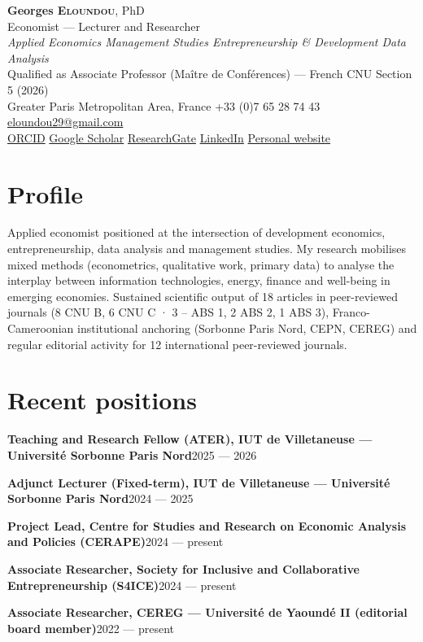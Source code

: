 \documentclass[
  french,
  10pt,
  letterpaper,
  DIV=11,
  numbers=noendperiod]{scrartcl}
\author{}
\date{}
\newcommand{\posteitem}[2]{\noindent\textbf{#1}\hfill{\color{softgray}\small #2}\par}
\begin{document}
\begin{center}
{\sffamily\fontsize{24pt}{28pt}\selectfont\textbf{\color{accent}Georges E\textsc{loundou}}, PhD}\\[4pt]
{\sffamily\large Economist — Lecturer and Researcher}\\[2pt]
{\itshape Applied Economics \;\textbar\; Management Studies \;\textbar\; Entrepreneurship \& Development \;\textbar\; Data Analysis}\\[6pt]
{\small\color{softgray} Qualified as Associate Professor (Maître de Conférences) — French CNU Section 5 (2026)}\\[8pt]
{\small Greater Paris Metropolitan Area, France \;\textbar\; +33 (0)7 65 28 74 43 \;\textbar\; \href{mailto:eloundou29@gmail.com}{eloundou29@gmail.com}}\\[3pt]
{\small \href{https://orcid.org/0000-0001-8187-5615}{ORCID} \;\textbar\; \href{https://scholar.google.com/citations?user=i_2zSosAAAAJ}{Google Scholar} \;\textbar\; \href{https://www.researchgate.net/profile/Georges-Ngnouwal-Eloundou}{ResearchGate} \;\textbar\; \href{https://www.linkedin.com/in/georges-eloundou}{LinkedIn} \;\textbar\; \href{https://georgeseloundou.github.io}{Personal website}}
\end{center}

\vspace{4pt}

\section{Profile}\label{profile}

Applied economist positioned at the intersection of development
economics, entrepreneurship, data analysis and management studies. My
research mobilises mixed methods (econometrics, qualitative work,
primary data) to analyse the interplay between information technologies,
energy, finance and well-being in emerging economies. Sustained
scientific output of 18 articles in peer-reviewed journals (8 CNU B, 6
CNU C · 3 -- ABS 1, 2 ABS 2, 1 ABS 3), Franco-Cameroonian institutional
anchoring (Sorbonne Paris Nord, CEPN, CEREG) and regular editorial
activity for 12 international peer-reviewed journals.

\section{Recent positions}\label{recent-positions}

\posteitem{Teaching and Research Fellow (ATER), IUT de Villetaneuse — Université Sorbonne Paris Nord}{2025 — 2026}
\posteitem{Adjunct Lecturer (Fixed-term), IUT de Villetaneuse — Université Sorbonne Paris Nord}{2024 — 2025}
\posteitem{Project Lead, Centre for Studies and Research on Economic Analysis and Policies (CERAPE)}{2024 — present}
\posteitem{Associate Researcher, Society for Inclusive and Collaborative Entrepreneurship (S4ICE)}{2024 — present}
\posteitem{Associate Researcher, CEREG — Université de Yaoundé II (editorial board member)}{2022 — present}
\end{document}
